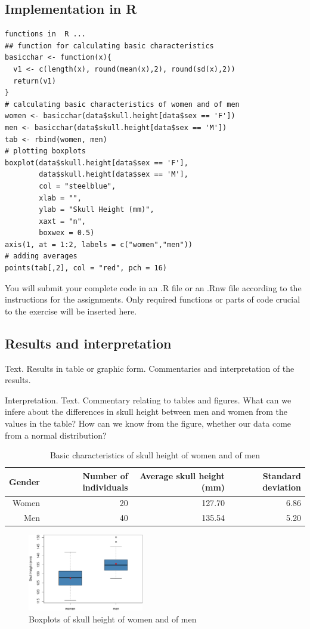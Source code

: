 \subsection*{Implementation in R}
\begin{lstlisting}
functions in  R ...
## function for calculating basic characteristics
basicchar <- function(x){
  v1 <- c(length(x), round(mean(x),2), round(sd(x),2))
  return(v1)
}
# calculating basic characteristics of women and of men
women <- basicchar(data$skull.height[data$sex == 'F'])
men <- basicchar(data$skull.height[data$sex == 'M'])
tab <- rbind(women, men)
# plotting boxplots
boxplot(data$skull.height[data$sex == 'F'], 
        data$skull.height[data$sex == 'M'],
        col = "steelblue", 
        xlab = "",
        ylab = "Skull Height (mm)",
        xaxt = "n", 
        boxwex = 0.5)
axis(1, at = 1:2, labels = c("women","men"))
# adding averages
points(tab[,2], col = "red", pch = 16)
\end{lstlisting}

You will submit your complete code in an \textsf{.R} file or an \textsf{.Rnw} file according to the instructions for the assignments. Only required functions or parts of code crucial to the exercise will be inserted here.
\bigskip
\subsection*{Results and interpretation}
\noindent Text. Results in table or graphic form. Commentaries and interpretation of the results.

 Interpretation. Text. Commentary relating to tables and figures. What can we infere about the differences in skull height between men and women from the values in the table? How can we know from the figure, whether our data come from a normal distribution?

\begin{table}[ht]
\footnotesize
\centering

\begin{tabular}{r||rrr}
 Gender & Number of individuals & Average skull height (mm) & Standard deviation \\ 
 \hline \hline
Women & 20 & 127.70 & 6.86 \\ 
Men & 40 & 135.54 & 5.20 \\ 
\end{tabular}
\caption{Basic characteristics of skull height of women and of men}
\end{table}


\begin{figure}[ht]
\centering
\includegraphics[angle=0,width=0.45\textwidth]{boxplot-example.pdf}
\caption{Boxplots of skull height of women and of men}
\end{figure}

